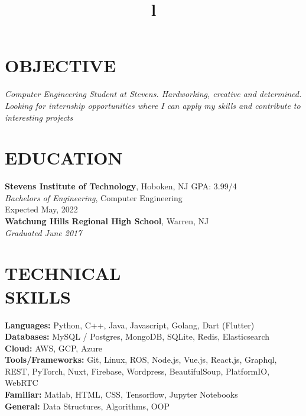 \documentclass[margin]{res}
\begin{document}
\begin{resume}

\section{OBJECTIVE}
{\sl Computer Engineering Student at Stevens. Hardworking, creative and determined. 
  Looking for internship opportunities where I can apply my skills and contribute to interesting projects}

\section{EDUCATION}
\textbf{Stevens Institute of Technology}, Hoboken, NJ \hfill GPA: 3.99/4\\
{\sl Bachelors of Engineering}, Computer Engineering\\
Expected May, 2022 \\
\textbf{Watchung Hills Regional High School}, Warren, NJ\\
{\sl Graduated June 2017}

\section{TECHNICAL\\SKILLS}

\textbf{Languages: } Python, C++, Java, Javascript, Golang, Dart (Flutter)
\\
\textbf{Databases: } MySQL / Postgres, MongoDB, SQLite, Redis, Elasticsearch
\\
\textbf{Cloud: } AWS, GCP, Azure
\\
\textbf{Tools/Frameworks: } Git, Linux, ROS, Node.js, Vue.js, React.js, Graphql, REST,
PyTorch, Nuxt, Firebase, Wordpress, BeautifulSoup, PlatformIO, WebRTC
\\
\textbf{Familiar: } Matlab, HTML, CSS, Tensorflow, Jupyter Notebooks
\\
\textbf{General: } Data Structures, Algorithms, OOP

\begin{format}
\title{l}\\
\\
\body\\
\end{format}


\end{resume}
\end{document}
